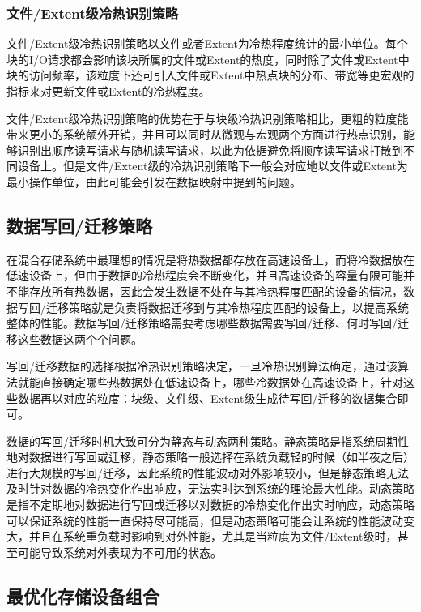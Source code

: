 \subsubsection{文件/Extent级冷热识别策略}

文件/Extent级冷热识别策略以文件或者Extent为冷热程度统计的最小单位。每个块的I/O请求都会影响该块所属的文件或Extent的热度，同时除了文件或Extent中块的访问频率，该粒度下还可引入文件或Extent中热点块的分布、带宽等更宏观的指标来对更新文件或Extent的冷热程度。

文件/Extent级冷热识别策略的优势在于与块级冷热识别策略相比，更粗的粒度能带来更小的系统额外开销，并且可以同时从微观与宏观两个方面进行热点识别，能够识别出顺序读写请求与随机读写请求，以此为依据避免将顺序读写请求打散到不同设备上。但是文件/Extent级的冷热识别策略下一般会对应地以文件或Extent为最小操作单位，由此可能会引发在数据映射中提到的问题。

\subsection{数据写回/迁移策略}

在混合存储系统中最理想的情况是将热数据都存放在高速设备上，而将冷数据放在低速设备上，但由于数据的冷热程度会不断变化，并且高速设备的容量有限可能并不能存放所有热数据，因此会发生数据不处在与其冷热程度匹配的设备的情况，数据写回/迁移策略就是负责将数据迁移到与其冷热程度匹配的设备上，以提高系统整体的性能。数据写回/迁移策略需要考虑哪些数据需要写回/迁移、何时写回/迁移这些数据这两个个问题。

写回/迁移数据的选择根据冷热识别策略决定，一旦冷热识别算法确定，通过该算法就能直接确定哪些热数据处在低速设备上，哪些冷数据处在高速设备上，针对这些数据再以对应的粒度：块级、文件级、Extent级生成待写回/迁移的数据集合即可。

数据的写回/迁移时机大致可分为静态与动态两种策略。静态策略是指系统周期性地对数据进行写回或迁移，静态策略一般选择在系统负载轻的时候（如半夜之后）进行大规模的写回/迁移，因此系统的性能波动对外影响较小，但是静态策略无法及时针对数据的冷热变化作出响应，无法实时达到系统的理论最大性能。动态策略是指不定期地对数据进行写回或迁移以对数据的冷热变化作出实时响应，动态策略可以保证系统的性能一直保持尽可能高，但是动态策略可能会让系统的性能波动变大，并且在系统重负载时影响到对外性能，尤其是当粒度为文件/Extent级时，甚至可能导致系统对外表现为不可用的状态。

\subsection{最优化存储设备组合}

